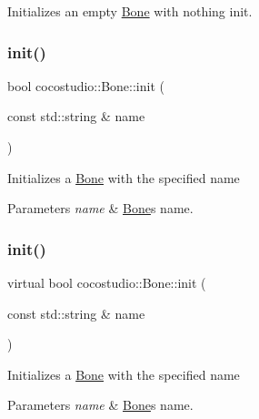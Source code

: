 Initializes an empty \hyperlink{classcocostudio_1_1Bone}{Bone} with nothing init. \mbox{\label{classcocostudio_1_1Bone_a63ed071b7e91199d2ccf4499b0e6241d}} 
\subsubsection{\texorpdfstring{init()}{init()}\hspace{0.1cm}{\footnotesize\ttfamily [3/4]}}
{\footnotesize\ttfamily bool cocostudio\+::\+Bone\+::init (\begin{DoxyParamCaption}\item[{const std\+::string \&}]{name }\end{DoxyParamCaption})\hspace{0.3cm}{\ttfamily [virtual]}}

Initializes a \hyperlink{classcocostudio_1_1Bone}{Bone} with the specified name 
\begin{DoxyParams}{Parameters}
{\em name} & \hyperlink{classcocostudio_1_1Bone}{Bone}\textquotesingle{}s name. \\
\hline
\end{DoxyParams}
\mbox{\label{classcocostudio_1_1Bone_a4d24218f2ff8e9edb8f85c9ea11cd066}} 
\subsubsection{\texorpdfstring{init()}{init()}\hspace{0.1cm}{\footnotesize\ttfamily [4/4]}}
{\footnotesize\ttfamily virtual bool cocostudio\+::\+Bone\+::init (\begin{DoxyParamCaption}\item[{const std\+::string \&}]{name }\end{DoxyParamCaption})\hspace{0.3cm}{\ttfamily [virtual]}}

Initializes a \hyperlink{classcocostudio_1_1Bone}{Bone} with the specified name 
\begin{DoxyParams}{Parameters}
{\em name} & \hyperlink{classcocostudio_1_1Bone}{Bone}\textquotesingle{}s name. \\
\hline
\end{DoxyParams}
\mbox{\label{classcocostudio_1_1Bone_a59fa87941ea1aedd616e6b36ca7a5a25}} 
